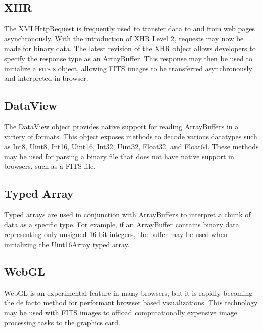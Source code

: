 \subsection{XHR}

The XMLHttpRequest \citep{W3CXHR} is frequently used to transfer data to and from web pages asynchronously.  With the introduction of XHR Level 2, requests may now be made for binary data.  The latest revision of the XHR object allows developers to specify the response type as an ArrayBuffer.  This response may then be used to initialize a \textsc{fitsjs} object, allowing FITS images to be transferred asynchronously and interpreted in-browser.

\subsection{DataView}

The DataView \citep{KhronosTypedArray} object provides native support for reading ArrayBuffers in a variety of formats.  This object exposes methods to decode various datatypes such as Int8, Uint8, Int16, Uint16, Int32, Uint32, Float32, and Float64.  These methods may be used for parsing a binary file that does not have native support in browsers, such as a FITS file.

\subsection{Typed Array}

Typed arrays \citep{KhronosTypedArray} are used in conjunction with ArrayBuffers to interpret a chunk of data as a specific type.  For example, if an ArrayBuffer contains binary data representing only unsigned 16 bit integers, the buffer may be used when initializing the Uint16Array typed array.

\subsection{WebGL}

WebGL \citep{KhronosWebGL} is an experimental feature in many browsers, but it is rapidly becoming the de facto method for performant browser based visualizations.  This technology may be used with FITS images to offload computationally expensive image processing tasks to the graphics card.


